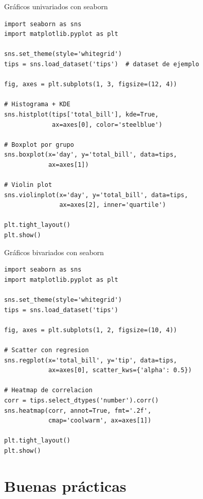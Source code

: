 \documentclass[aspectratio=169]{beamer}
\begin{document}
\begin{frame}[fragile]{Gráficos univariados con seaborn}
\begin{lstlisting}[style=python]
import seaborn as sns
import matplotlib.pyplot as plt

sns.set_theme(style='whitegrid')
tips = sns.load_dataset('tips')  # dataset de ejemplo

fig, axes = plt.subplots(1, 3, figsize=(12, 4))

# Histograma + KDE
sns.histplot(tips['total_bill'], kde=True,
             ax=axes[0], color='steelblue')

# Boxplot por grupo
sns.boxplot(x='day', y='total_bill', data=tips,
            ax=axes[1])

# Violin plot
sns.violinplot(x='day', y='total_bill', data=tips,
               ax=axes[2], inner='quartile')

plt.tight_layout()
plt.show()
\end{lstlisting}
\end{frame}

\begin{frame}[fragile]{Gráficos bivariados con seaborn}
\begin{lstlisting}[style=python]
import seaborn as sns
import matplotlib.pyplot as plt

sns.set_theme(style='whitegrid')
tips = sns.load_dataset('tips')

fig, axes = plt.subplots(1, 2, figsize=(10, 4))

# Scatter con regresion
sns.regplot(x='total_bill', y='tip', data=tips,
            ax=axes[0], scatter_kws={'alpha': 0.5})

# Heatmap de correlacion
corr = tips.select_dtypes('number').corr()
sns.heatmap(corr, annot=True, fmt='.2f',
            cmap='coolwarm', ax=axes[1])

plt.tight_layout()
plt.show()
\end{lstlisting}
\end{frame}

\section{Buenas prácticas}
\end{document}
